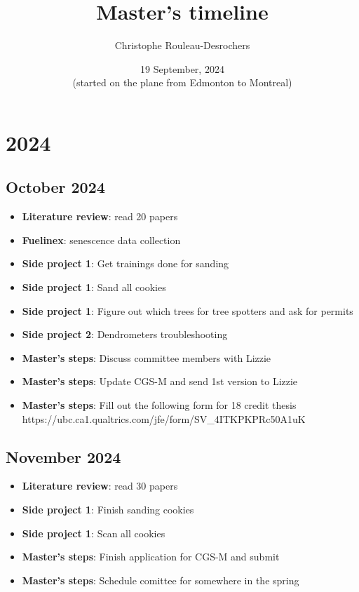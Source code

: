 \documentclass{article}
\title{Master's timeline}
\author[]{Christophe Rouleau-Desrochers}
\date{19 September, 2024 \\ (started on the plane from Edmonton to Montreal)}
\begin{document}
\maketitle

\section{2024}
\subsection {October 2024}
\begin {itemize}
	\item \textbf{Literature review}: read 20 papers
	\item \textbf{Fuelinex}: senescence data collection
	\item \textbf{Side project 1}: Get trainings done for sanding 
	\item \textbf{Side project 1}: Sand all cookies
	\item \textbf{Side project 1}: Figure out which trees for tree spotters and ask for permits
	\item \textbf{Side project 2}: Dendrometers troubleshooting
	\item \textbf{Master's steps}: Discuss committee members with Lizzie 
	\item \textbf{Master's steps}: Update CGS-M and send 1st version to Lizzie
	\item \textbf{Master's steps}: Fill out the following form for 18 credit thesis https://ubc.ca1.qualtrics.com/jfe/form/SV_4ITKPKPRc50A1uK
\end {itemize}

\subsection {November 2024}
\begin {itemize}
	\item \textbf{Literature review}: read 30 papers
	\item \textbf{Side project 1}: Finish sanding cookies
	\item \textbf{Side project 1}: Scan all cookies
	\item \textbf{Master's steps}: Finish application for CGS-M and submit
	\item \textbf{Master's steps}: Schedule comittee for somewhere in the spring
\end {itemize}
\end{document}
